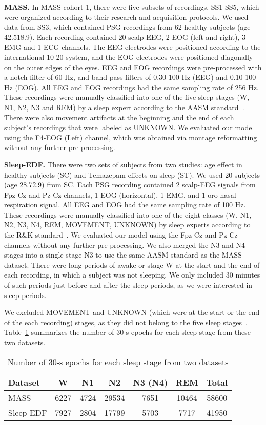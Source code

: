 \documentclass[journal,twoside]{IEEEtran}
\let\MYoriglatexcaption\caption
\renewcommand{\caption}[2][\relax]{\MYoriglatexcaption[#2]{#2}}
\begin{document}
\textbf{MASS.} In MASS cohort 1, there were five subsets of recordings, SS1-SS5, which were organized according to their research and acquisition protocols. We used data from SS3, which contained PSG recordings from 62 healthy subjects (age 42.518.9). Each recording contained 20 scalp-EEG, 2 EOG (left and right), 3 EMG and 1 ECG channels. The EEG electrodes were positioned according to the international 10-20 system, and the EOG electrodes were positioned diagonally on the outer edges of the eyes. EEG and EOG recordings were pre-processed with a notch filter of 60 Hz, and band-pass filters of 0.30-100 Hz (EEG) and 0.10-100 Hz (EOG). All EEG and EOG recordings had the same sampling rate of 256 Hz. These recordings were manually classified into one of the five sleep stages (W, N1, N2, N3 and REM) by a sleep expert according to the AASM standard~\cite{iber2007}. There were also movement artifacts at the beginning and the end of each subject's recordings that were labeled as UNKNOWN. We evaluated our model using the F4-EOG (Left) channel, which was obtained via montage reformatting~\cite{lagerlund2000} without any further pre-processing. 


\textbf{Sleep-EDF.} There were two sets of subjects from two studies: age effect in healthy subjects (SC) and Temazepam effects on sleep (ST). We used 20 subjects (age 28.72.9) from SC. Each PSG recording contained 2 scalp-EEG signals from Fpz-Cz and Pz-Cz channels, 1 EOG (horizontal), 1 EMG, and 1 oro-nasal respiration signal. All EEG and EOG had the same sampling rate of 100 Hz. These recordings were manually classified into one of the eight classes (W, N1, N2, N3, N4, REM, MOVEMENT, UNKNOWN) by sleep experts according to the R\&K standard~\cite{AllanHobson1969}. We evaluated our model using the Fpz-Cz and Pz-Cz channels without any further pre-processing. We also merged the N3 and N4 stages into a single stage N3 to use the same AASM standard as the MASS dataset. There were long periods of awake or stage W at the start and the end of each recording, in which a subject was not sleeping. We only included 30 minutes of such periods just before and after the sleep periods, as we were interested in sleep periods.

We excluded MOVEMENT and UNKNOWN (which were at the start or the end of the each recording) stages, as they did not belong to the five sleep stages~\cite{iber2007}. Table~\ref{tab:dataset} summarizes the number of 30-s epochs for each sleep stage from these two datasets.

\begin{table}[!t]
\renewcommand{\arraystretch}{1.3}
\caption{Number of 30-s epochs for each sleep stage from two datasets}
\label{tab:dataset}
\centering
\begin{tabular}{|l|cccccc|}
\hline
Dataset   & W    & N1   & N2    & N3 (N4) & REM   & Total \\ \hline
MASS      & 6227 & 4724 & 29534 & 7651    & 10464 & 58600 \\
Sleep-EDF & 7927 & 2804 & 17799 & 5703    & 7717  & 41950 \\ \hline
\end{tabular}
\end{table}
\end{document}
